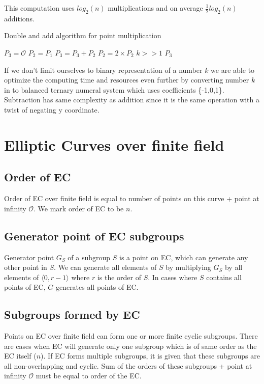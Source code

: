 \documentclass[bp,en]{FEIstyle}
\begin{document}
This computation uses $log_2(n)$ multiplications and on average $\frac{1}{2}log_2(n)$ additions. 


\newpage

\begin{algorithm}
\caption{Double and add algorithm for point multiplication }  
\label{alg:double-and-add-safer}                         
\begin{algorithmic}[1]                    
    \STATE $P_3 = \mathcal{O}$
    \STATE $P_2 = P_1$ 
            \STATE $P_3= P_3 + P_2$ 
        \ENDIF
        \STATE $P_2 = 2 \times P_2$ 
        \STATE $k >> 1$
    \ENDWHILE
    \RETURN $P_3$
\end{algorithmic}
\end{algorithm}
If we don't limit ourselves to  binary representation of a number $k$ we are able to optimize the computing time and resources even further by converting number $k$ in to balanced ternary numeral system which uses coefficients \{-1,0,1\}. Subtraction has same complexity as addition since it is the same operation with a twist of negating y coordinate. 

\newpage

\section*{Elliptic Curves over finite field}

\subsection*{Order of EC}
Order of EC over finite field is equal to number of points on this curve + point at infinity $\mathcal{O}$. We mark order of EC to be $n$.

\subsection*{Generator point of EC subgroups}
Generator point $G_S$ of a subgroup $S$ is a point on EC, which can generate any other point in $S$. We can generate all elements of $S$ by multiplying $G_S$ by all elements of $\langle 0,r-1\rangle $ where $r$ is the order of $S$. In cases where $S$ contains all points of EC, $G$ generates all points of EC.

\subsection*{Subgroups formed by EC}
Points on EC over finite field can form one or more finite cyclic subgroups. There are cases when EC will generate only one subgroup which is of same order as the EC itself ($n$). If EC forms multiple subgroups, it is given that these subgroups are all non-overlapping and cyclic. Sum of the orders of these subgroups + point at infinity $\mathcal{O}$ must be equal to order of the EC. 
\end{document}
